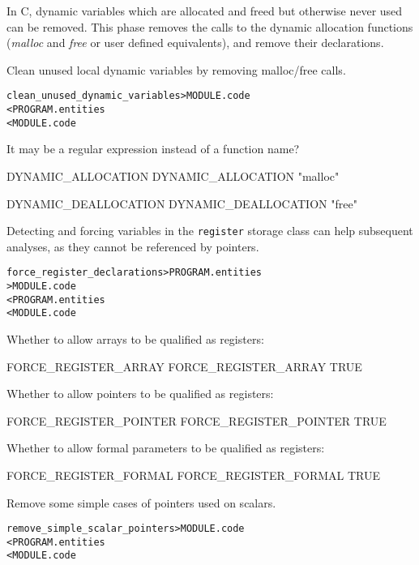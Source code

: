 \documentclass[a4paper]{report}
\newenvironment{PipsMake}{\begin{alltt}}{\end{alltt}}
\newenvironment{PipsPass}[1]{\label{pass:#1}}{}
\begin{document}
In C, dynamic variables which are allocated and freed but otherwise
never used can be removed. This phase removes the calls to the
dynamic allocation functions (\emph{malloc} and \emph{free} or
user defined equivalents), and remove their declarations.

\begin{PipsPass}{clean_dynamic_variables}
Clean unused local dynamic variables by removing malloc/free calls.
\end{PipsPass}
\begin{PipsMake}
clean_unused_dynamic_variables > MODULE.code
	< PROGRAM.entities
	< MODULE.code
\end{PipsMake}

It may be a regular expression instead of a function name?
\begin{PipsProp}{DYNAMIC_ALLOCATION}
DYNAMIC_ALLOCATION "malloc"
\end{PipsProp}
\begin{PipsProp}{DYNAMIC_DEALLOCATION}
DYNAMIC_DEALLOCATION "free"
\end{PipsProp}

Detecting and forcing variables in the \texttt{register} storage class can
help subsequent analyses, as they cannot be referenced by pointers.
\begin{PipsMake}
force_register_declarations > PROGRAM.entities
                            > MODULE.code
         < PROGRAM.entities
         < MODULE.code
\end{PipsMake}

Whether to allow arrays to be qualified as registers:
\begin{PipsProp}{FORCE_REGISTER_ARRAY}
FORCE_REGISTER_ARRAY TRUE
\end{PipsProp}

Whether to allow pointers to be qualified as registers:
\begin{PipsProp}{FORCE_REGISTER_POINTER}
FORCE_REGISTER_POINTER TRUE
\end{PipsProp}

Whether to allow formal parameters to be qualified as registers:
\begin{PipsProp}{FORCE_REGISTER_FORMAL}
FORCE_REGISTER_FORMAL TRUE
\end{PipsProp}


\begin{PipsPass}{remove_simple_scalar_pointers}
Remove some simple cases of pointers used on scalars.
\end{PipsPass}
\begin{PipsMake}
remove_simple_scalar_pointers > MODULE.code
         < PROGRAM.entities
         < MODULE.code
\end{PipsMake}
\end{document}

